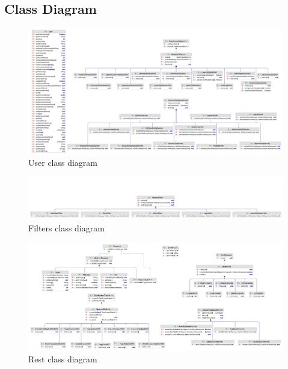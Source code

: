 \subsection{Class Diagram}

\begin{figure}[H]
    \centering
    \includegraphics[width=1\textwidth]{images/classUser.png}
    \caption{User class diagram}
    \label{fig:user class diagram}
\end{figure}

\begin{figure}[H]
    \centering
    \includegraphics[width=1\textwidth]{images/classFilterDiagram.png}
    \caption{Filters class diagram}
    \label{fig:filters}
\end{figure}

\begin{figure}[H]
    \centering
    \includegraphics[width=1\textwidth]{images/classRest.png}
    \caption{Rest class diagram}
    \label{fig:rest}
\end{figure}

